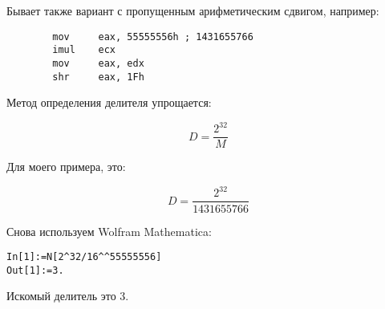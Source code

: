 Бывает также вариант с пропущенным арифметическим сдвигом, например:

\begin{lstlisting}
		mov     eax, 55555556h ; 1431655766
		imul    ecx
		mov     eax, edx
		shr     eax, 1Fh
\end{lstlisting}

Метод определения делителя упрощается:

\[
D=\frac{2^{32}}{M}
\]

Для моего примера, это:

\[
D=\frac{2^{32}}{1431655766}
\]

Снова используем Wolfram Mathematica:

\begin{lstlisting}[caption=Wolfram Mathematica]
In[1]:=N[2^32/16^^55555556]
Out[1]:=3.
\end{lstlisting}

Искомый делитель это 3.
